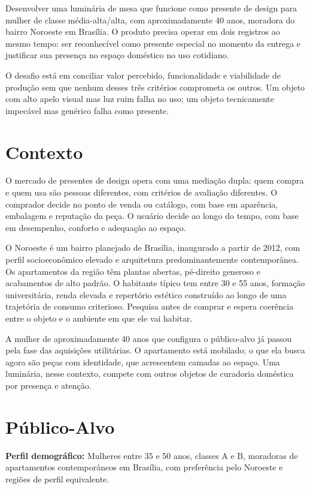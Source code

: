 \documentclass[
  12pt,
  a4paper,
  oneside,
  brazil
]{article}
\let\oldsection\section
\renewcommand{\section}{\clearpage\oldsection}
\begin{document}
Desenvolver uma luminária de mesa que funcione como presente de design para mulher
de classe média-alta/alta, com aproximadamente 40 anos, moradora do bairro Noroeste
em Brasília. O produto precisa operar em dois registros ao mesmo tempo: ser
reconhecível como presente especial no momento da entrega e justificar sua presença
no espaço doméstico no uso cotidiano.

O desafio está em conciliar valor percebido, funcionalidade e viabilidade de produção
sem que nenhum desses três critérios comprometa os outros. Um objeto com alto apelo
visual mas luz ruim falha no uso; um objeto tecnicamente impecável mas genérico
falha como presente.

\section{Contexto}

O mercado de presentes de design opera com uma mediação dupla: quem compra e quem
usa são pessoas diferentes, com critérios de avaliação diferentes. O comprador decide
no ponto de venda ou catálogo, com base em aparência, embalagem e reputação da peça.
O usuário decide ao longo do tempo, com base em desempenho, conforto e adequação
ao espaço.

O Noroeste é um bairro planejado de Brasília, inaugurado a partir de 2012, com perfil
socioeconômico elevado e arquitetura predominantemente contemporânea. Os apartamentos
da região têm plantas abertas, pé-direito generoso e acabamentos de alto padrão. O
habitante típico tem entre 30 e 55 anos, formação universitária, renda elevada e
repertório estético construído ao longo de uma trajetória de consumo criterioso.
Pesquisa antes de comprar e espera coerência entre o objeto e o ambiente em que ele
vai habitar.

A mulher de aproximadamente 40 anos que configura o público-alvo já passou pela
fase das aquisições utilitárias. O apartamento está mobilado; o que ela busca agora
são peças com identidade, que acrescentem camadas ao espaço. Uma luminária, nesse
contexto, compete com outros objetos de curadoria doméstica por presença e atenção.

\section{Público-Alvo}

\noindent\textbf{Perfil demográfico:} Mulheres entre 35 e 50 anos, classes A e B,
moradoras de apartamentos contemporâneos em Brasília, com preferência pelo Noroeste
e regiões de perfil equivalente.
\end{document}
